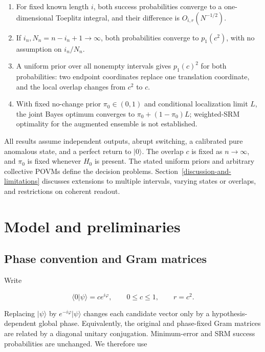 \begin{enumerate}
\def\labelenumi{\arabic{enumi}.}
\tightlist
\item
  For fixed known length \(i\), both success probabilities converge to a
  one-dimensional Toeplitz integral, and their difference is
  \(O_{i,r}(N^{-1/2})\).
\item
  If \(i_n,N_n=n-i_n+1\to\infty\), both probabilities converge to
  \(p_1(c^2)\), with no assumption on \(i_n/N_n\).
\item
  A uniform prior over all nonempty intervals gives \(p_1(c)^2\) for both
  probabilities: two endpoint coordinates replace one translation coordinate,
  and the local overlap changes from \(c^2\) to \(c\).
\item
  With fixed no-change prior \(\pi_0\in(0,1)\) and conditional localization
  limit \(L\), the joint Bayes optimum converges to
  \(\pi_0+(1-\pi_0)L\); weighted-SRM optimality for the augmented ensemble is
  not established.
\end{enumerate}

All results assume independent outputs, abrupt switching, a calibrated pure
anomalous state, and a perfect return to \(\lvert0\rangle\). The overlap \(c\)
is fixed as \(n\to\infty\), and \(\pi_0\) is fixed whenever \(H_0\) is present.
The stated uniform priors and arbitrary collective POVMs define the decision
problems. Section~\ref{discussion-and-limitations} discusses extensions to
multiple intervals, varying states or overlaps, and restrictions on coherent
readout.

\section{Model and preliminaries}\label{model-and-discrimination-preliminaries}

\subsection{Phase convention and Gram matrices}\label{phase-convention-and-gram-matrices}

Write

\[
\langle0|\psi\rangle=ce^{i\varphi},\qquad 0\le c\le1,
\qquad r=c^2.
\]

Replacing \(|\psi\rangle\) by \(e^{-i\varphi}|\psi\rangle\) changes each candidate vector only by a hypothesis-dependent global phase. Equivalently, the original and phase-fixed Gram matrices are related by a diagonal unitary conjugation. Minimum-error and SRM success probabilities are unchanged. We therefore use

